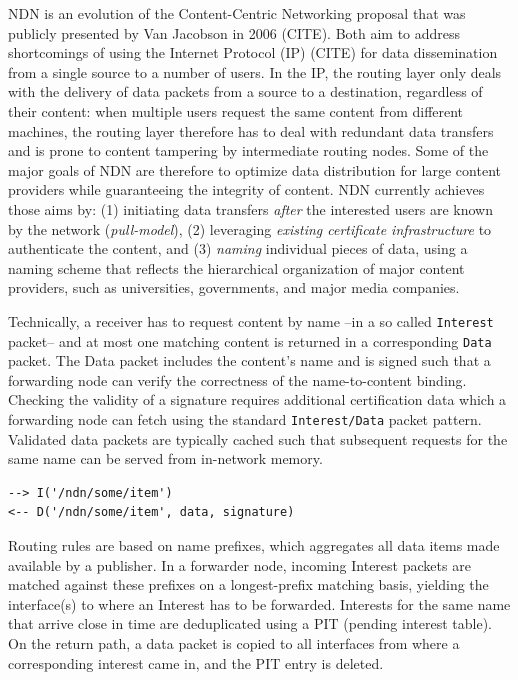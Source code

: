 \documentclass[9pt,sigconf]{acmart}
\begin{document}
NDN is an evolution of the Content-Centric Networking proposal that was publicly presented by Van Jacobson in 2006 (CITE). Both aim to address shortcomings of using the Internet Protocol (IP) (CITE) for data dissemination from a single source to a number of users. In the IP, the routing layer only deals with the delivery of data packets from a source to a destination, regardless of their content: when multiple users request the same content from different machines, the routing layer therefore has to deal with redundant data transfers and is prone to content tampering by intermediate routing nodes. Some of the major goals of NDN are therefore to optimize data distribution for large content providers while guaranteeing the integrity of content. NDN currently achieves those aims by: (1) initiating data transfers \textit{after} the interested users are known by the network (\textit{pull-model}), (2) leveraging \textit{existing certificate infrastructure} to authenticate the content, and (3) \textit{naming} individual pieces of data, using a naming scheme that reflects the hierarchical organization of major content providers, such as universities, governments, and major media companies.

Technically, a receiver has to request content by name --in a so called {\tt Interest} packet-- and
at most one matching content is returned in a corresponding {\tt Data}
packet. The Data packet includes the content's name and is signed such
that a forwarding node can verify the correctness of the
name-to-content binding. Checking the validity of a signature requires
additional certification data which a forwarding node can fetch using
the standard {\tt Interest/Data} packet pattern. Validated data
packets are typically cached such that subsequent requests for the
same name can be served from in-network memory.

\begin{verbatim}
--> I('/ndn/some/item')
<-- D('/ndn/some/item', data, signature)
\end{verbatim}

Routing rules are based on name prefixes, which aggregates
all data items made available by a publisher. In a forwarder node,
incoming Interest packets are matched against these prefixes on a
longest-prefix matching basis, yielding the interface(s) to where an
Interest has to be forwarded. Interests for the same name that arrive
close in time are deduplicated using a PIT (pending interest
table). On the return path, a data packet is copied to all interfaces
from where a corresponding interest came in, and the PIT entry is
deleted.
\end{document}
